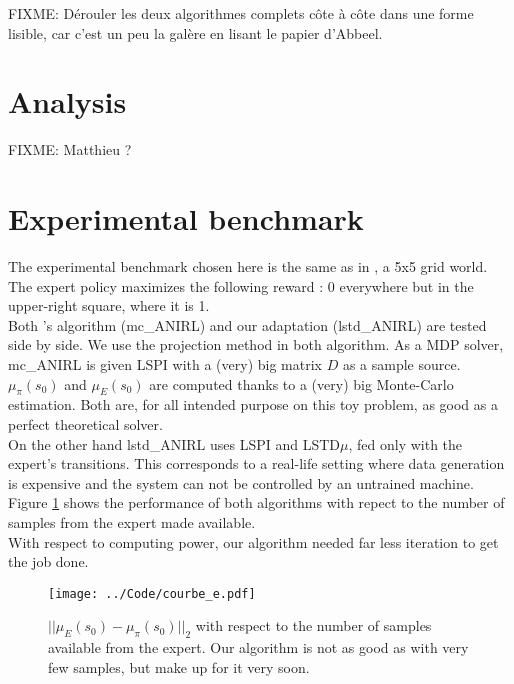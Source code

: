 \documentclass{article}
\begin{document}

FIXME: Dérouler les deux algorithmes complets côte à côte dans une forme lisible, car c'est un peu la galère en lisant le papier d'Abbeel.
\section{Analysis}
FIXME: Matthieu ?
\section{Experimental benchmark}
The experimental benchmark chosen here is the same as in \citep{ng2000algorithms}, a 5x5 grid world. The expert policy maximizes the following reward : 0 everywhere but in the upper-right square, where it is 1.\\

Both \cite{abbeel2004apprenticeship}'s algorithm (mc\_ANIRL) and our adaptation (lstd\_ANIRL) are tested side by side. We use the projection method in both algorithm. As a MDP solver, mc\_ANIRL is given LSPI with a (very) big matrix $D$ as a sample source. $\mu_\pi(s_0)$ and $\mu_E(s_0)$ are computed thanks to a (very) big Monte-Carlo estimation. Both are, for all intended purpose on this toy problem, as good as a perfect theoretical solver.\\

On the other hand lstd\_ANIRL uses LSPI and LSTD$\mu$, fed only with the expert's transitions. This corresponds to a real-life setting where data generation is expensive and the system can not be controlled by an untrained machine.\\

Figure \ref{fig:E} shows the performance of both algorithms with repect to the number of samples from the expert made available.\\

With respect to computing power, our algorithm needed far less iteration to get the job done.
\begin{figure}
\texttt{[image: ../Code/courbe\_e.pdf]}
\caption{$||\mu_E(s_0)-\mu_\pi(s_0)||_2$ with respect to the number of samples available from the expert. Our algorithm is not as good as \citet{abbeel2004apprenticeship} with very few samples, but make up for it very soon.}
\label{fig:E}
\end{figure}
\end{document}
